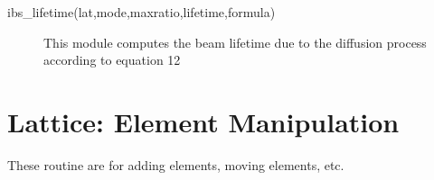 \begin{description}

\label{r:ibs.lifetime}
\item[ibs_lifetime(lat,mode,maxratio,lifetime,formula)] \Newline 
 This module computes the beam lifetime due to
 the diffusion process according to equation 12

\end{description}

\section{Lattice: Element Manipulation}
\label{r:elem}     

These routine are for adding elements, moving elements, etc.

